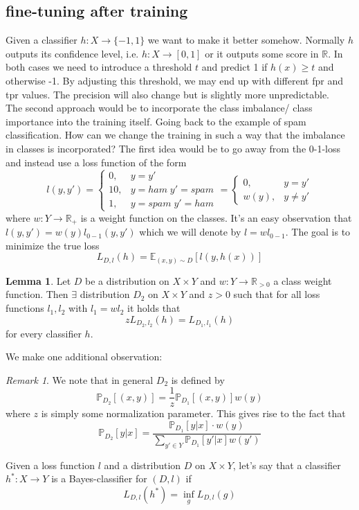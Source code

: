 \documentclass[a4paper, 12pt]{article}
\theoremstyle{plain}
\theoremstyle{definition}
\theoremstyle{lemma}
\newtheorem{lemma}[theorem]{Lemma}
\theoremstyle{remark}
\newtheorem{remark}[theorem]{Remark}
\theoremstyle{example}
\begin{document}
	\subsection{fine-tuning after training}
	Given a classifier $h:X \to \{-1,1\}$ we want to make it better somehow. Normally $h$ outputs its confidence level, i.e. $h:X\to [0,1]$ or it outputs some score in $\mathbb{R}$. In both cases we need to introduce a threshold $t$ and predict 1 if $h(x)\geq t$ and otherwise -1. By adjusting this threshold, we may end up with different fpr and tpr values. The precision will also change but is slightly more unpredictable.\\
	The second approach would be to incorporate the class imbalance/ class importance into the training itself. Going back to the example of spam classification. How can we change the training in such a way that the imbalance in classes is incorporated? The first idea would be to go away from the 0-1-loss and instead use a loss function of the form \[l(y,y') = \begin{cases}
		0, & y=y'\\
		10,& y=ham\; y' = spam\\
		1, & y=spam\; y'=ham
	\end{cases} = \begin{cases}
		0,& y=y'\\
		w(y), & y\neq y'
	\end{cases}\] where $w:Y\to \mathbb{R}_+$ is a weight function on the classes. It's an easy observation that $l(y,y') = w(y) l_{0-1}(y,y')$ which we will denote by $l=wl_{0-1}$. The goal is to minimize the true loss \[L_{D,l}(h) = \mathbb{E}_{(x,y)\sim D} [l(y,h(x))]\]
	\begin{lemma}
		Let $D$ be a distribution on $X\times Y$ and $w:Y\to \mathbb{R}_{>0}$ a class weight function. Then $\exists$ distribution $D_2$ on $X\times Y$ and $z>0$ such that for all loss functions $l_1,l_2$ with $l_1=wl_2$ it holds that \[zL_{D_2,l_2}(h) = L_{D_1,l_1}(h)\] for every classifier $h$.
	\end{lemma}
	We make one additional observation: \begin{remark}
		We note that in general $D_2$ is defined by \[\mathbb{P}_{D_2}[(x,y)] = \frac{1}{z}\mathbb{P}_{D_1}[(x,y)]w(y)\] where $z$ is simply some normalization parameter. This gives rise to the fact that \[\mathbb{P}_{D_2}[y|x] = \frac{\mathbb{P}_{D_1}[y|x]\cdot w(y)}{\sum_{y' \in Y}\mathbb{P}_{D_1}[y'|x]w(y')}\]
	\end{remark}
	Given a loss function $l$ and a distribution $D$ on $X\times Y$, let's say that a classifier $h^*:X\to Y$ is a Bayes-classifier for $(D,l)$ if \[L_{D,l}(h^*) = \inf_g L_{D,l}(g)\]
\end{document}
